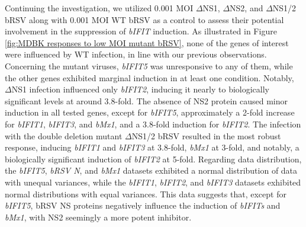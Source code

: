 Continuing the investigation, we utilized 0.001 MOI \(\Delta\)NS1, \(\Delta\)NS2, and \(\Delta\)NS1/2 bRSV along with 0.001 MOI WT bRSV as a control to assess their potential involvement in the suppression of \textit{bIFIT} induction. As illustrated in Figure \ref{fig:MDBK responses to low MOI mutant bRSV}, none of the genes of interest were influenced by WT infection, in line with our previous observations. Concerning the mutant viruses, \textit{bIFIT5} was unresponsive to any of them, while the other genes exhibited marginal induction in at least one condition. Notably, \(\Delta\)NS1 infection influenced only \textit{bIFIT2}, inducing it nearly to biologically significant levels at around 3.8-fold. The absence of NS2 protein caused minor induction in all tested genes, except for \textit{bIFIT5}, approximately a 2-fold increase for \textit{bIFIT1}, \textit{bIFIT3}, and \textit{bMx1}, and a 3.8-fold induction for \textit{bIFIT2}. The infection with the double deletion mutant \(\Delta\)NS1/2 bRSV resulted in the most robust response, inducing \textit{bIFIT1} and \textit{bIFIT3} at 3.8-fold, \textit{bMx1} at 3-fold, and notably, a biologically significant induction of \textit{bIFIT2} at 5-fold. Regarding data distribution, the \textit{bIFIT5}, \textit{bRSV N}, and \textit{bMx1} datasets exhibited a normal distribution of data with unequal variances, while the \textit{bIFIT1}, \textit{bIFIT2}, and \textit{bIFIT3} datasets exhibited normal distributions with equal variances. This data suggests that, except for \textit{bIFIT5}, bRSV NS proteins negatively influence the induction of \textit{bIFITs} and \textit{bMx1}, with NS2 seemingly a more potent inhibitor.

